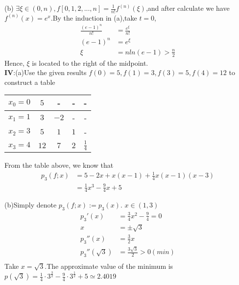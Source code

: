 \documentclass{ctexart}
\begin{document}
(b) $\exists \xi \in (0,n) , f[0,1,2,...,n]=\frac{1}{n!}f^{(n)}(\xi)$,and after calculate we have $f^{(n)}(x)=e^x$.By the induction in (a),take $t=0$,
\begin{align*}
    \frac{(e-1)^n}{n!}&=\frac{e^{\xi}}{n!}\\
    (e-1)^n&=e^{\xi}\\
    \xi&=nln(e-1)>\frac{n}{2}
\end{align*}
Hence, $\xi$ is located to the right of the midpoint.
\\


\textbf{IV}:(a)Use the given results $f(0)=5,f(1)=3,f(3)=5,f(4)=12$ to construct a table 
\begin{table}[!htbp]
    \centering
    \begin{tabular}{|c|c|c|c|c|}
    \hline
    $x_0=0$&$5$&-&-&-\\
    \hline
    $x_1=1$&$3$&$-2$&-&-\\
    \hline 
    $x_2=3$&$5$&$1$&$1$&-\\
    \hline
    $x_3=4$&$12$&$7$&$2$&$\frac{1}{4}$\\
    \hline
    \end{tabular}
\end{table}
From the table above, we know that
\begin{align*}
    p_3(f;x)&=5-2x+x(x-1)+\frac{1}{4}x(x-1)(x-3)\\
    &=\frac{1}{4}x^3-\frac{9}{4}x+5
\end{align*}

(b)Simply denote $p_3(f;x):=p_3(x)$. $x \in (1,3)$
\begin{align*}
    p_3'(x)&=\frac{3}{4}x^2-\frac{9}{4}=0\\
    x&=\pm \sqrt{3}\\
    p_3''(x)&=\frac{3}{2}x\\
    p_3''(\sqrt{3})&=\frac{3\sqrt{3}}{2}>0(min)\\
\end{align*}
Take $x=\sqrt{3}$.The approximate value of the minimum is $p(\sqrt{3})=\frac{1}{4} \cdot 3^{\frac{3}{2}}-\frac{9}{4} \cdot 3^{\frac{1}{2}}+5 \simeq 2.4019$
\\
\end{document}
